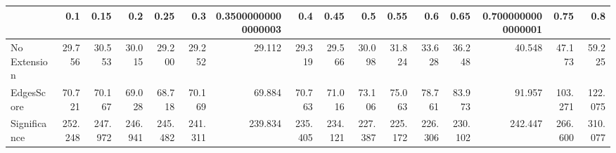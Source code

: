 \begin{tabular}{lrrrrrrrrrrrrrrr}
\toprule
{} &     0.1 &    0.15 &     0.2 &    0.25 &     0.3 & 0.35000000000000003 &     0.4 &    0.45 &     0.5 &    0.55 &     0.6 &    0.65 & 0.7000000000000001 &    0.75 &     0.8 \\
\midrule
No Extension &  29.756 &  30.553 &  30.015 &  29.200 &  29.252 &              29.112 &  29.319 &  29.566 &  30.098 &  31.824 &  33.628 &  36.248 &             40.548 &  47.173 &  59.225 \\
EdgesScore   &  70.721 &  70.167 &  69.028 &  68.718 &  70.169 &              69.884 &  70.763 &  71.016 &  73.106 &  75.063 &  78.761 &  83.973 &             91.957 & 103.271 & 122.075 \\
Significance & 252.248 & 247.972 & 246.941 & 245.482 & 241.311 &             239.834 & 235.405 & 234.121 & 227.387 & 225.172 & 226.306 & 230.102 &            242.447 & 266.600 & 310.077 \\
\bottomrule
\end{tabular}
